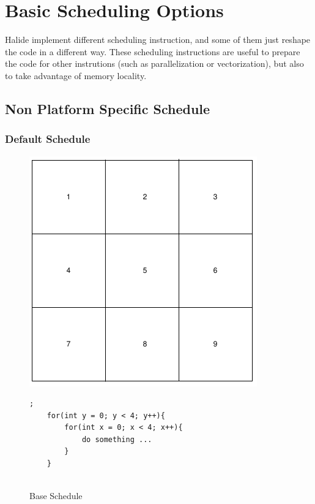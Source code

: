 	\section {Basic Scheduling Options}
	\label{section:scheduling}

	Halide implement different scheduling instruction, and some of them just reshape the code in a different way. These scheduling instructions are useful to prepare the code for other instrutions (such as parallelization or vectorization), but also to  take advantage of memory locality.
\newcommand\EIW{.4\textwidth}
\newcommand\ECW{\textwidth - \EIW}
	\subsection{ Non Platform Specific Schedule}

	\subsubsection{Default Schedule}


\begin{figure}[h]
		\begin{minipage}[c]{\EIW}
			\centering
		\includegraphics[width=\textwidth]{Images/BaseOrder.png}
		\end{minipage}
		\begin{minipage}[c]{\ECW}
			\centering
			\begin{lstlisting}[label={code:reorder}];
	for(int y = 0; y < 4; y++){
		for(int x = 0; x < 4; x++){
			do something ...
		}
	}
	
\end{lstlisting}
		\end{minipage}
	\caption{Base Schedule}
	\label{schedule:default}
\end{figure}



